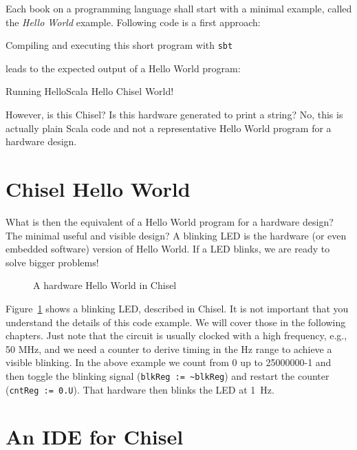 \documentclass[%
    10pt, %
    headinclude, footexclude,
    openright, %
    notitlepage,
    cleardoubleempty,
    headsepline,
    pointlessnumbers,
    bibtotoc, idxtotoc,
    ]{scrbook}
\newcommand{\code}[1]{{\small{\texttt{#1}}}}
\begin{document}
Each book on a programming language shall start with a minimal example,
called the \emph{Hello World} example. Following code is a first approach:





\noindent Compiling and executing this short program with \code{sbt}


\noindent leads to the expected output of a Hello World program:

\begin{chisel}
[info] Running HelloScala
Hello Chisel World!
\end{chisel}

\noindent However, is this Chisel? Is this hardware generated to print a string?
No, this is actually plain Scala code and not a representative Hello World
program for a hardware design.

\section{Chisel Hello World}

What is then the equivalent of a Hello World program for a hardware design?
The minimal useful and visible design? A blinking LED is the hardware (or even
embedded software) version of Hello World. If a LED blinks, we are ready to
solve bigger problems!


\begin{figure}

\caption{A hardware Hello World in Chisel}
\label{fig:chisel:hello}
\end{figure}

Figure~\ref{fig:chisel:hello} shows a blinking LED, described in Chisel.
It is not important that you understand the details of this code example.
We will cover those in the following chapters. Just note that the circuit is
usually clocked with a high frequency, e.g., 50 MHz, and we need a counter
to derive timing in the Hz range to achieve a visible blinking. In the above
example we count from 0 up to 25000000-1 and then toggle the blinking signal
(\code{blkReg := \textasciitilde blkReg}) and restart the counter (\code{cntReg := 0.U}).
That hardware then blinks the LED at 1~Hz.

\section{An IDE for Chisel}
\end{document}
